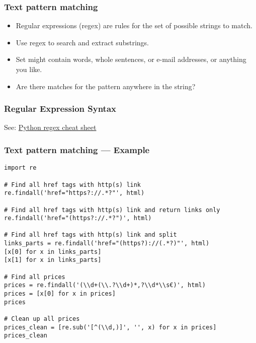 
\begin{frame}
    \frametitle{Text pattern matching}
    \begin{itemize}
        \item Regular expressions (regex) are rules for the set of
        possible strings to match.
        \item Use regex to search and extract substrings.
        \item Set might contain words, whole sentences, or e-mail
        addresses, or anything you like.
        \item Are there matches for the pattern anywhere in the string?
    \end{itemize}
\end{frame}

\begin{frame}
    \frametitle{Regular Expression Syntax}

    See: \href{https://www.dataquest.io/wp-content/uploads/2019/03/python-regular-expressions-cheat-sheet.pdf}{Python regex cheat sheet}
\end{frame}

\begin{frame}
    \frametitle{Text pattern matching --- Example}
\begin{verbatim}
import re

# Find all href tags with http(s) link
re.findall('href="https?://.*?"', html)

# Find all href tags with http(s) link and return links only
re.findall('href="(https?://.*?")', html)

# Find all href tags with http(s) link and split
links_parts = re.findall('href="(https?)://(.*?)"', html)
[x[0] for x in links_parts]
[x[1] for x in links_parts]

# Find all prices
prices = re.findall('(\\d+(\\.?\\d+)*,?\\d*\\s€)', html)
prices = [x[0] for x in prices]
prices

# Clean up all prices
prices_clean = [re.sub('[^(\\d,)]', '', x) for x in prices]
prices_clean
\end{verbatim}
\end{frame}